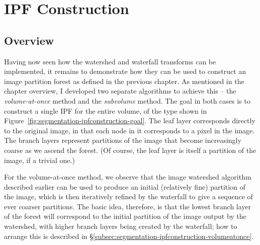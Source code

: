 \clearpage

\section{IPF Construction}
\label{sec:segmentation-ipfconstruction}

\subsection{Overview}

Having now seen how the watershed and waterfall transforms can be implemented, it remains to demonstrate how they can be used to construct an image partition forest as defined in the previous chapter. As mentioned in the chapter overview, I developed two separate algorithms to achieve this -- the \emph{volume-at-once} method and the \emph{subvolume} method. The goal in both cases is to construct a single IPF for the entire volume, of the type shown in Figure~\ref{fig:segmentation-ipfconstruction-goal}. The leaf layer corresponds directly to the original image, in that each node in it corresponds to a pixel in the image. The branch layers represent partitions of the image that become increasingly coarse as we ascend the forest. (Of course, the leaf layer is itself a partition of the image, if a trivial one.)


For the volume-at-once method, we observe that the image watershed algorithm described earlier can be used to produce an initial (relatively fine) partition of the image, which is then iteratively refined by the waterfall to give a sequence of ever coarser partitions. The basic idea, therefore, is that the lowest branch layer of the forest will correspond to the initial partition of the image output by the watershed, with higher branch layers being created by the waterfall; how to arrange this is described in \S\ref{subsec:segmentation-ipfconstruction-volumeatonce}.

